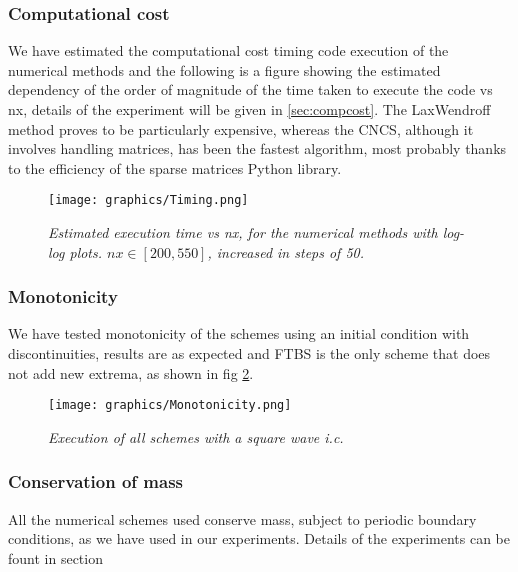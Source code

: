\subsubsection{Computational cost}
We have estimated the computational cost timing code execution of the numerical methods and the following is a figure showing the estimated dependency of the order of magnitude of the time taken to execute the code vs nx, details of the experiment will be given in \ref{sec:compcost}. The LaxWendroff method proves to be particularly expensive, whereas the CNCS, although it involves handling matrices, has been the fastest algorithm, most probably thanks to the efficiency of the sparse matrices Python library.
\begin{figure}[H]
	\begin{center}
		\texttt{[image: graphics/Timing.png]}
	\end{center}%
	\caption[computational cost of numerical methods]{ \em Estimated execution time vs nx, for the numerical methods with log-log plots.  $nx\in [200, 550]$, increased in steps of 50.}
	\label{fig:timing}
\end{figure}

\subsubsection{Monotonicity}
We have tested monotonicity of the schemes using an initial condition with discontinuities, results are as expected and FTBS is the only scheme that does not add new extrema, as shown in fig \ref{fig:mono}.
\begin{figure}[H]
	\begin{center}
		\texttt{[image: graphics/Monotonicity.png]}
	\end{center}%
	\caption[Monotonicity]{ \em Execution of all schemes with a square wave i.c.}
	\label{fig:mono}
\end{figure}

\subsubsection{Conservation of mass}
All the numerical schemes used conserve mass, subject to periodic boundary conditions, as we have used in our experiments. Details of the experiments can be fount in section 

